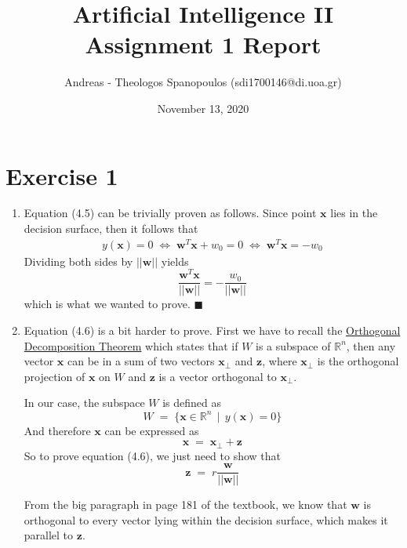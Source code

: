 \documentclass[12pt]{report}
\title{Artificial Intelligence II \\ Assignment 1 Report}
\author{Andreas - Theologos Spanopoulos (sdi1700146@di.uoa.gr)}
\date{November 13, 2020}
\newcommand*{\QEDA}{\hfill\ensuremath{\blacksquare}}
\begin{document}
\maketitle

\section*{Exercise 1}
\begin{enumerate}
    \item Equation (4.5) can be trivially proven as follows. Since point $\textbf{x}$ lies
        in the decision surface, then it follows that
        \begin{align*}
            y(\textbf{x}) = 0 \;\Leftrightarrow\; \textbf{w}^T\textbf{x} + w_0 = 0 \;\Leftrightarrow\;
            \textbf{w}^T\textbf{x} = -w_0
        \end{align*}
        Dividing both sides by $||\textbf{w}||$ yields $$\frac{\textbf{w}^T\textbf{x}}{||\textbf{w}||}
        = -\frac{w_0}{||\textbf{w}||}$$
        which is what we wanted to prove. \QEDA
        \smallskip

    \item Equation (4.6) is a bit harder to prove. First we have to recall the
        \href{https://mathworld.wolfram.com/OrthogonalDecomposition.html}{Orthogonal
        Decomposition Theorem} which states that if $W$ is a subspace of $\mathbb{R}^n$, then any
        vector $\textbf{x}$ can be  in a sum of two vectors
        $\textbf{x}_{\perp}$ and $\textbf{z}$, where $\textbf{x}_{\perp}$ is the
        orthogonal projection of $\textbf{x}$ on $W$ and $\textbf{z}$ is a vector orthogonal
        to $\textbf{x}_{\perp}$.

        In our case, the subspace $W$ is defined as
        $$W \;=\; \{\textbf{x} \in \mathbb{R}^n\;\,|\;\, y(\textbf{x}) = 0\}$$
        And therefore $\textbf{x}$ can be expressed as
        $$\textbf{x} \;=\; \textbf{x}_{\perp} + \textbf{z}$$
        So to prove equation (4.6), we just need to show that
        \begin{equation}
            \textbf{z} \;=\; r \frac{\textbf{w}}{||\textbf{w}||}  
        \end{equation}

        From the big paragraph in page 181 of the 
        textbook, we know that $\textbf{w}$ is orthogonal to every vector lying within the decision
        surface, which makes it parallel to $\textbf{z}$.


\end{enumerate}
\end{document}
